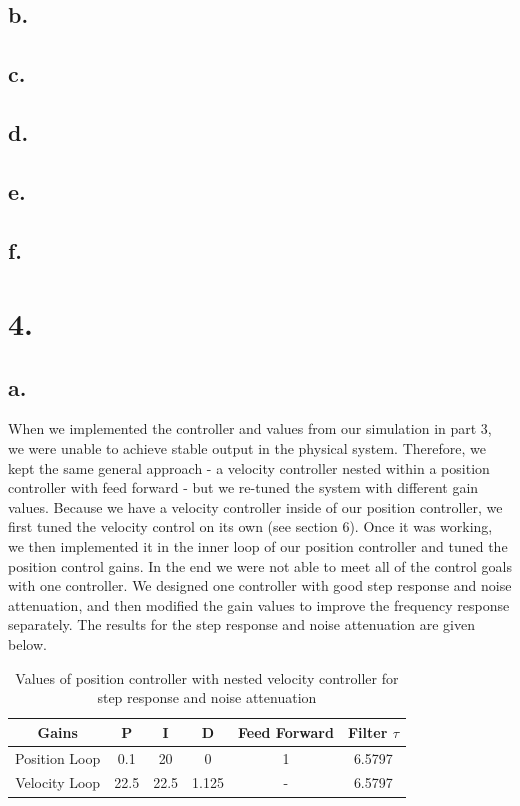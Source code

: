 \documentclass{article}
\theoremstyle{plain}
\theoremstyle{definition}
\theoremstyle{remark}
\begin{document}
\subsection*{b.}

\subsection*{c.}

\subsection*{d.}

\subsection*{e.}

\subsection*{f.}

\section*{4.}

\subsection*{a.}
When we implemented the controller and values from our simulation in part 3, we were unable to achieve stable output in the physical system. Therefore, we kept the same general approach - a velocity controller nested within a position controller with feed forward - but we re-tuned the system with different gain values. Because we have a velocity controller inside of our position controller, we first tuned the velocity control on its own (see section 6). Once it was working, we then implemented it in the inner loop of our position controller and tuned the position control gains. In the end we were not able to meet all of the control goals with one controller. We designed one controller with good step response and noise attenuation, and then modified the gain values to improve the frequency response separately. The results for the step response and noise attenuation are given below.  

\begin{table}[htb]
\begin{center}
    \begin{tabular}{|c|c|c|c|c|c|}
        \hline
        Gains & P   & I & D   & Feed Forward   & Filter $\tau$   \\ \hline
        Position Loop            & 0.1 & 20  & 0 & 1 & 6.5797    \\ 
        Velocity Loop       & 22.5   & 22.5    & 1.125   & -  & 6.5797  \\ 
       \hline
    \end{tabular}
\end{center}
\caption{Values of position controller with nested velocity controller for step response and noise attenuation}
\label{positionGains}
\end{table}
\end{document}
